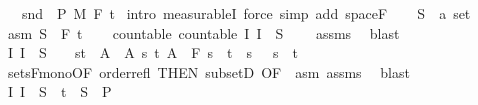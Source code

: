 \begin{isabellebody}
\ \ \ {\isachardoublequoteopen}snd\ {\isasymin}\ {\isasymSigma}\isactrlsub P\ {\isasymrightarrow}\isactrlsub M\ F\ t\isanewline
%
\isadelimproof
%
\endisadelimproof
%
\isatagproof
{}\isamarkupfalse%
\ {\isacharparenleft}{\kern0pt}intro\ measurableI{\isacharcomma}{\kern0pt}\ force\ simp\ add{\isacharcolon}{\kern0pt}\ space{\isacharunderscore}{\kern0pt}F{\isacharparenright}{\kern0pt}\isanewline
\ \ \isamarkupfalse%
\ S\ {\isacharcolon}{\kern0pt}{\isacharcolon}{\kern0pt}\ {\isachardoublequoteopen}{\isacharprime}{\kern0pt}a\ set{\isachardoublequoteclose}\ \isamarkupfalse%
\ asm{\isacharcolon}{\kern0pt}\ {\isachardoublequoteopen}S\ {\isasymin}\ F\ t\isanewline
\ \ \isamarkupfalse%
\ countable{\isacharcolon}{\kern0pt}\ {\isachardoublequoteopen}countable\ {\isacharparenleft}{\kern0pt}{\isacharparenleft}{\kern0pt}{\isasymlambda}I{\isachardot}{\kern0pt}\ I\ {\isasymtimes}\ S{\isacharparenright}{\kern0pt}\ {\isacharbackquote}{\kern0pt}\ {\isasymI}{\isacharparenright}{\kern0pt}{\isachardoublequoteclose}\ \isamarkupfalse%
\ assms{\isacharparenleft}{\kern0pt}{}{\isacharparenright}{\kern0pt}\ \isamarkupfalse%
\ blast\isanewline
\ \ \isamarkupfalse%
\ {\isachardoublequoteopen}{\isacharparenleft}{\kern0pt}{\isasymlambda}I{\isachardot}{\kern0pt}\ I\ {\isasymtimes}\ S{\isacharparenright}{\kern0pt}\ {\isacharbackquote}{\kern0pt}\ {\isasymI}\ {\isasymsubseteq}\ {\isacharbraceleft}{\kern0pt}{\isacharbraceleft}{\kern0pt}s{\isacharless}{\kern0pt}{\isachardot}{\kern0pt}{\isachardot}{\kern0pt}t{\isacharbraceright}{\kern0pt}\ {\isasymtimes}\ A\ {\isacharbar}{\kern0pt}\ A\ s\ t{\isachardot}{\kern0pt}\ A\ {\isasymin}\ F\ s\ {\isasymand}\ t\ {\isasymle}\ s\ {\isasymand}\ \ s\ {\isacharless}{\kern0pt}\ t{\isacharbraceright}{\kern0pt}{\isachardoublequoteclose}\ \isamarkupfalse%
\ sets{\isacharunderscore}{\kern0pt}F{\isacharunderscore}{\kern0pt}mono{\isacharbrackleft}{\kern0pt}OF\ order{\isacharunderscore}{\kern0pt}refl{\isacharcomma}{\kern0pt}\ THEN\ subsetD{\isacharcomma}{\kern0pt}\ OF\ {\isacharunderscore}{\kern0pt}\ asm{\isacharbrackright}{\kern0pt}\ assms{\isacharparenleft}{\kern0pt}{}{\isacharparenright}{\kern0pt}\ \isamarkupfalse%
\ blast\isanewline
\ \ \isamarkupfalse%
\ {\isachardoublequoteopen}{\isacharparenleft}{\kern0pt}{\isasymUnion}I{\isasymin}{\isasymI}{\isachardot}{\kern0pt}\ I\ {\isasymtimes}\ S{\isacharparenright}{\kern0pt}\ {\isasymunion}\ {\isacharbraceleft}{\kern0pt}t\ {\isasymtimes}\ S\ {\isasymin}\ {\isasymSigma}\isactrlsub P{\isachardoublequoteclose}\ \isamarkupfalse%

\end{isabellebody}
